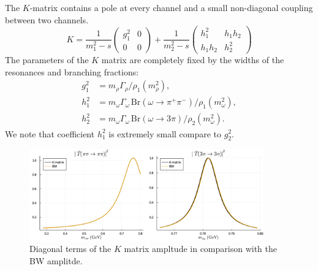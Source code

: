 \documentclass[aps,prd,superscriptaddress,onecolumn,nofootinbib,preprintnumbers,notitlepage]{revtex4-1}
\begin{document}
The $K$-matrix contains a pole at every channel and a small non-diagonal coupling between two channels.
\begin{equation} \label{eq:K}
  K = \frac{1}{m_1^2-s}\begin{pmatrix}
    g_1^2 & 0\\
    0 & 0
  \end{pmatrix} +
  \frac{1}{m_2^2-s}\begin{pmatrix}
    h_1^2 & h_1 h_2\\
    h_1 h_2 & h_2^2
  \end{pmatrix}
\end{equation}
The parameters of the $K$ matrix are completely fixed by the widths of the resonances and branching fractions:
\begin{align}
  g_1^2 & = m_\rho \Gamma_\rho / \rho_1(m_\rho^2),\\ \nonumber
  h_1^2 & = m_\omega \Gamma_\omega\,\text{Br}(\omega\to\pi^+\pi^-) / \rho_1(m_\omega^2),\\ \nonumber
  h_2^2 & = m_\omega \Gamma_\omega\,\text{Br}(\omega\to3\pi) / \rho_2(m_\omega^2).
\end{align}
We note that coefficient $h_1^2$ is extremely small compare to $g_2^2$.
\begin{figure}
  \includegraphics[width=0.9\textwidth]{BW_vs_Kmatrix.pdf}
  \caption{Diagonal terms of the $K$ matrix ampltude in comparison with the BW amplitde.}
\end{figure}


\end{document}
